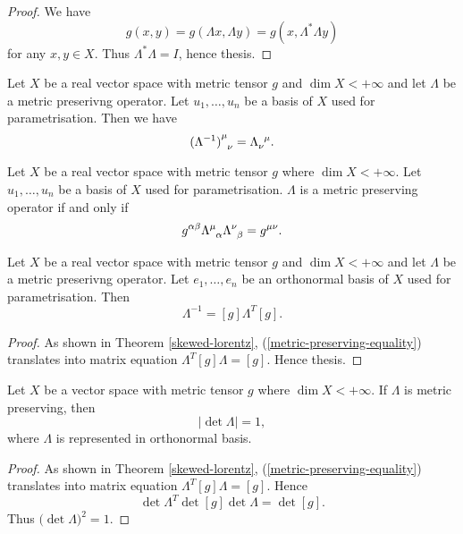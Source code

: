\documentclass[main.tex]{subfiles}
\begin{document}
\begin{proof}
We have
\begin{equation}
g(x, y) = g(\Lambda x, \Lambda y) = g(x, \Lambda^* \Lambda y)
\end{equation}
for any $x, y\in X$. Thus $\Lambda^* \Lambda = I$, hence thesis.
\end{proof}

\begin{corollary}
Let $X$ be a real vector space with metric tensor $g$ and $\dim X < +\infty$ and let $\Lambda$ be a metric preserivng operator. Let $u_1, \dots, u_n$ be a basis of $X$ used for parametrisation. Then we have
\begin{equation}
\tensor{{(\Lambda^{-1})}}{^\mu_\nu} = \tensor{\Lambda}{_\nu^\mu}.
\end{equation}
\end{corollary}

\begin{corollary}
Let $X$ be a real vector space with metric tensor $g$ where $\dim X < +\infty$. Let $u_1, \dots, u_n$ be a basis of $X$ used for parametrisation. $\Lambda$ is a metric preserving operator if and only if
\begin{equation}
\label{metric-preserving-equality-2}
g^{\alpha\beta} \tensor{\Lambda}{^\mu_\alpha} \tensor{\Lambda}{^\nu_\beta} = g^{\mu\nu}. 
\end{equation}
\end{corollary}

\begin{theorem}
\label{metric-preserving-inverse-representation}
Let $X$ be a real vector space with metric tensor $g$ and $\dim X < +\infty$ and let $\Lambda$ be a metric preserivng operator. Let $e_1, \dots, e_n$ be an orthonormal basis of $X$ used for parametrisation. Then
\begin{equation}
\Lambda^{-1} = [g]\Lambda^T[g] .
\end{equation}
\end{theorem}
\begin{proof}
As shown in Theorem \ref{skewed-lorentz}, (\ref{metric-preserving-equality}) translates into matrix equation $\Lambda^T[g]\Lambda = [g]$. Hence thesis.
\end{proof}

\begin{theorem}
Let $X$ be a vector space with metric tensor $g$ where $\dim X < +\infty$. If $\Lambda$ is metric preserving, then
\begin{equation}
|\det \Lambda| = 1, 
\end{equation}
where $\Lambda$ is represented in orthonormal basis. 
\end{theorem}
\begin{proof}
As shown in Theorem \ref{skewed-lorentz}, (\ref{metric-preserving-equality}) translates into matrix equation $\Lambda^T[g]\Lambda = [g]$. Hence
\begin{equation}
\det\Lambda^T \det[g] \det \Lambda = \det [g].
\end{equation}
Thus $\big(\det \Lambda \big)^2 = 1$.  
\end{proof}
\end{document}
